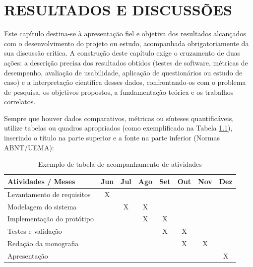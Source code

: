 \chapter{RESULTADOS E DISCUSSÕES}
Este capítulo destina-se à apresentação fiel e objetiva dos resultados alcançados com o desenvolvimento do projeto ou estudo, acompanhada obrigatoriamente da sua discussão crítica. A construção deste capítulo exige o cruzamento de duas ações: a descrição precisa dos resultados obtidos (testes de software, métricas de desempenho, avaliação de usabilidade, aplicação de questionários ou estudo de caso) e a interpretação científica desses dados, confrontando-os com o problema de pesquisa, os objetivos propostos, a fundamentação teórica e os trabalhos correlatos.

Sempre que houver dados comparativos, métricas ou sínteses quantificáveis, utilize tabelas ou quadros apropriados (como exemplificado na Tabela \ref{tab:acompanhamento}), inserindo o título na parte superior e a fonte na parte inferior (Normas ABNT/UEMA):

\begin{table}[htb]
\centering
\caption{\label{tab:acompanhamento}Exemplo de tabela de acompanhamento de atividades}
\begin{tabular}{|l|c|c|c|c|c|c|c|}
\hline
\textbf{Atividades / Meses} & \textbf{Jun} & \textbf{Jul} & \textbf{Ago} & \textbf{Set} & \textbf{Out} & \textbf{Nov} & \textbf{Dez} \\ \hline
Levantamento de requisitos & X & & & & & & \\ \hline
Modelagem do sistema & & X & X & & & & \\ \hline
Implementação do protótipo & & & X & X & & & \\ \hline
Testes e validação & & & & X & X & & \\ \hline
Redação da monografia & & & & & X & X & \\ \hline
Apresentação & & & & & & & X \\ \hline
\end{tabular}
\end{table}
